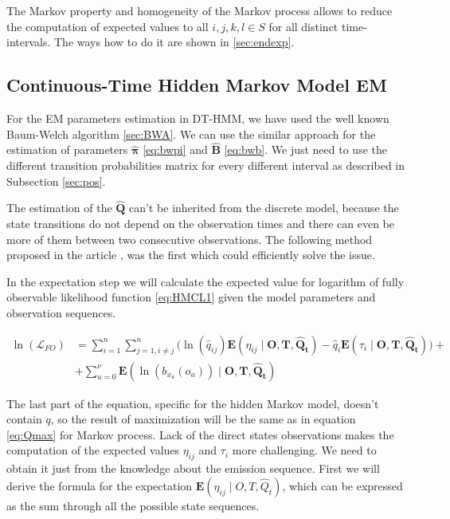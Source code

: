 \documentclass[thesis=M,english]{FITthesis}[2012/10/20]
\newcommand{\matr}[1]{\mathbf{#1}}
\begin{document}
The Markov property and homogeneity of the Markov process allows to reduce the computation of expected values to all $i,j,k,l \in S$ for all distinct time-intervals. The ways how to do it are shown in \ref{sec:endexp}.     
   
\subsection{Continuous-Time Hidden Markov Model EM}\label{sec:CBWA}

For the EM parameters estimation in DT-HMM, we have used the well known Baum-Welch algorithm \ref{sec:BWA}. We can use the similar approach for the estimation of parameters $\boldsymbol{\hat \pi}$ \eqref{eq:bwpi} and $\matr{ \hat B }$ \eqref{eq:bwb}. We just need to use the different transition probabilities matrix for every different interval as described in Subsection \ref{sec:pos}.  

The estimation of the $\matr{ \hat Q }$ can't be inherited from the discrete model, because the state transitions do not depend on the observation times and there can even be more of them between two consecutive observations. The following method proposed in the article \cite{Li15}, was the first which could efficiently solve the issue.        

In the expectation step we will calculate the expected value for logarithm of fully observable likelihood function \eqref{eq:HMCL1} given the model parameters and observation sequences.

\begin{equation}\label{eq:EMCTHMM}
\begin{aligned}  
 \ln(\mathcal{L}_{FO}) &= \sum_{i=1}^{n} \sum_{j=1, i \neq j}^{n} \big( \ln( \hat q_{ij}) \mathbf{E}( \eta_{ij} \mid \matr{O},\matr{T}, \matr{ \hat Q_t } ) - \hat q_i \mathbf{E}( \tau_i \mid \matr{O},\matr{T}, \matr{ \hat Q_t } ) \big) + \\
    &+ \sum_{u=0}^{\nu} \mathbf{E}( \ln( b_{ x_u }(o_u) ) \mid \matr{O},\matr{T},\matr{\hat Q_t} )
\end{aligned}
\end{equation}

The last part of the equation, specific for the hidden Markov model, doesn't contain $q$, so the result of maximization will be the same as in equation \eqref{eq:Qmax} for Markov process. Lack of the direct states observations makes the computation of the expected values $\eta_{ij}$ and $\tau_i$ more challenging. We need to obtain it just from the knowledge about the emission sequence. First we will derive the formula for the expectation $\mathbf{E}(\eta_{ij} \mid O,T, \hat Q_t )$, which can be expressed as the sum through all the possible state sequences.
\end{document}

